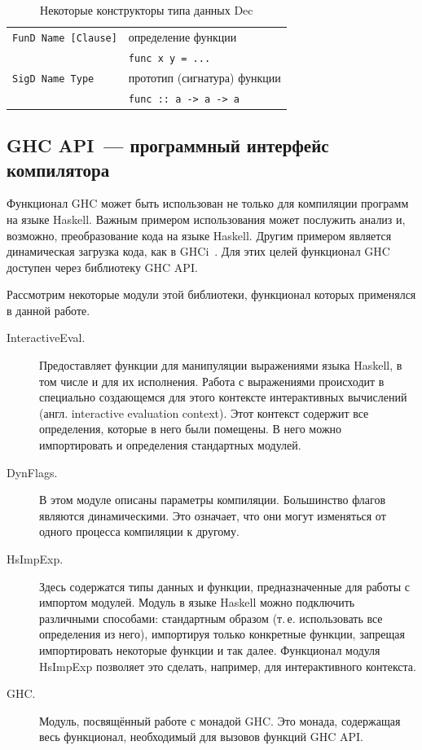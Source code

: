 \begin{table}[h]
\begin{center}
	\begin{tabular}{ll}
		{\lstinline!FunD Name [Clause]!} & определение функции \\
										 & {\lstinline!func x y = ...!} \\
		{\lstinline!SigD Name Type!} & прототип (сигнатура) функции \\
									 & {\lstinline!func :: a -> a -> a!}
	\end{tabular}
\end{center}
\caption{Некоторые конструкторы типа данных Dec}
\label{decconstr}
\end{table}
	\subsection{GHC API~--- программный интерфейс компилятора}\label{ghcapisec} Функционал GHC может быть использован не только для компиляции программ на языке Haskell. Важным примером использования может послужить анализ и, возможно, преобразование кода на языке Haskell. Другим примером является динамическая загрузка кода, как	в GHCi~\autocite{GHClib}. Для этих целей функционал GHC доступен через библиотеку GHC API.
	
	Рассмотрим некоторые модули этой библиотеки, функционал которых применялся в данной работе.
	\begin{description}
		\item[InteractiveEval.] Предоставляет функции для манипуляции выражениями языка Haskell, в том числе и для их исполнения. Работа с выражениями происходит в специально создающемся для этого контексте интерактивных вычислений (англ. interactive evaluation context). Этот контекст содержит все определения, которые в него были помещены. В него можно импортировать и определения стандартных модулей.
		\item[DynFlags.] В этом модуле описаны параметры компиляции. Большинство флагов являются динамическими. Это означает, что они могут изменяться от одного процесса компиляции к другому.
		\item[HsImpExp.] Здесь содержатся типы данных и функции, предназначенные для работы с импортом модулей. Модуль в языке Haskell можно подключить различными способами: стандартным образом (т.\,е. использовать все определения из него), импортируя только конкретные функции, запрещая импортировать некоторые функции и так далее. Функционал модуля HsImpExp позволяет это сделать, например, для интерактивного контекста.
		\item[GHC.] Модуль, посвящённый работе с монадой GHC. Это монада, содержащая весь функционал, необходимый для вызовов функций GHC API. 
	\end{description} 

